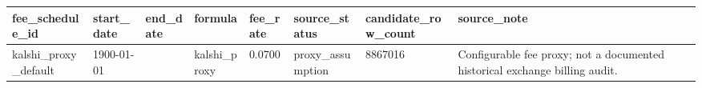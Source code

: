 \begin{tabular}{llllllll}
\toprule
fee\_schedule\_id & start\_date & end\_date & formula & fee\_rate & source\_status & candidate\_row\_count & source\_note \\
\midrule
kalshi\_proxy\_default & 1900-01-01 &  & kalshi\_proxy & 0.0700 & proxy\_assumption & 8867016 & Configurable fee proxy; not a documented historical exchange billing audit. \\
\bottomrule
\end{tabular}
